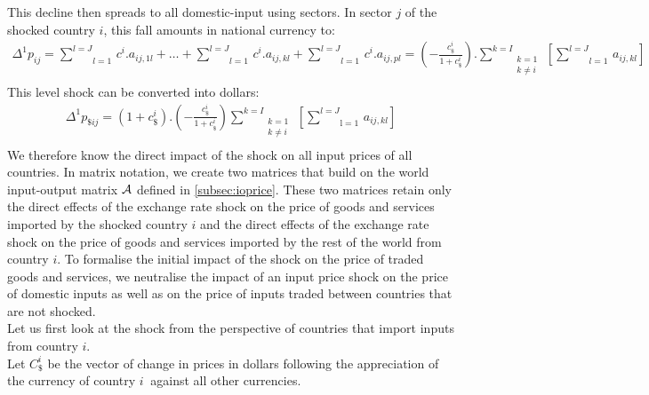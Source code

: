 \documentclass[11pt,a4paper]{article}
\begin{document}
This decline then spreads to all domestic-input using sectors. In sector $j$ of the shocked country $i$, this fall amounts in national currency to: \\
\begin{eqnarray*}
\Delta^1p_{ij}=\underset{l=1}{\overset{l=J}{\mathop \sum}}\,c^i.a_{ij,1l}+\ldots +\underset{l=1}{\overset{{l}=J}{\mathop \sum }}\,c^i.a_{ij,kl}+\underset{l=1}{\overset{l={J}}{\mathop \sum }}\,c^i.{{a}_{ij,pl}}=\left( -\frac{c_\$^i}{1+c_\$^i}\right).\underset{\begin{matrix}k=1\\k\neq i\\\end{matrix}}{\overset{k=I}{\mathop\sum}}\,\left[\underset{l=1}{\overset{l=J}{\mathop\sum}}\,a_{ij,kl}\right] 
\end{eqnarray*}
This level shock can be converted into dollars: \\
\begin{eqnarray}
{{\Delta }^{1}}{{{p}}_{\$ij}}=\left(1+c_\$^i\right).\left(-\frac{c_\$^i}{1+c_\$^i}\right)\underset{\begin{matrix}k=1\\k\neq i\\\end{matrix}}{\overset{{k}={I}}{\mathop\sum}}\,\left[\underset{\text{l}=1}{\overset{{l}={J}}{\mathop\sum}}\,{{{a}}_{ij,kl}}\right] 
\label{eq:eq2}
\end{eqnarray}
We therefore know the direct impact of the shock on all input prices of all countries.
In matrix notation, we create two matrices that build on the world input-output matrix $\cal A$ defined in \ref{subsec:ioprice}. 
These two matrices retain only the direct effects of the exchange rate shock on the price of goods and services imported by the shocked country $i$ and the direct effects of the exchange rate shock on the price of goods and services imported by the rest of the world from country $i$. 
To formalise the initial impact of the shock on the price of traded goods and services, we neutralise the impact of an input price shock on the price of domestic inputs as well as on the price of inputs traded between countries that are not shocked.\\
Let us first look at the shock from the perspective of countries that import inputs from country $i$.\\
Let $C_\$^i$ be the vector of change in prices in dollars following the 
appreciation of the currency of country $i~$ against all other currencies.
\end{document}
